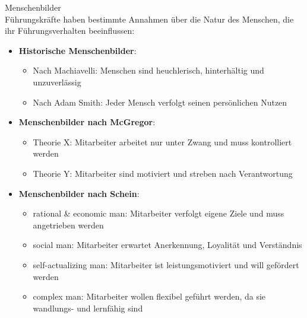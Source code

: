 \begin{concept}{Menschenbilder}\\
Führungskräfte haben bestimmte Annahmen über die Natur des Menschen, die ihr Führungsverhalten beeinflussen:
\begin{itemize}
    \item \textbf{Historische Menschenbilder}:
    \begin{itemize}
        \item Nach Machiavelli: Menschen sind heuchlerisch, hinterhältig und unzuverlässig
        \item Nach Adam Smith: Jeder Mensch verfolgt seinen persönlichen Nutzen
    \end{itemize}
    \item \textbf{Menschenbilder nach McGregor}:
    \begin{itemize}
        \item Theorie X: Mitarbeiter arbeitet nur unter Zwang und muss kontrolliert werden
        \item Theorie Y: Mitarbeiter sind motiviert und streben nach Verantwortung
    \end{itemize}
    \item \textbf{Menschenbilder nach Schein}:
    \begin{itemize}
        \item rational \& economic man: Mitarbeiter verfolgt eigene Ziele und muss angetrieben werden
        \item social man: Mitarbeiter erwartet Anerkennung, Loyalität und Verständnis
        \item self-actualizing man: Mitarbeiter ist leistungsmotiviert und will gefördert werden
        \item complex man: Mitarbeiter wollen flexibel geführt werden, da sie wandlungs- und lernfähig sind
    \end{itemize}
\end{itemize}
\end{concept}

